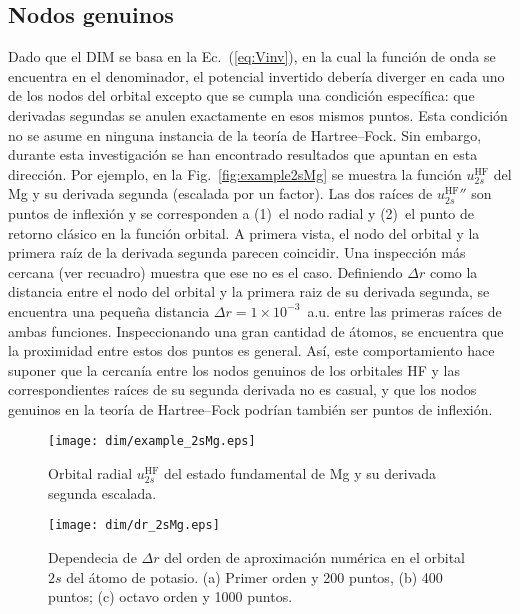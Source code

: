 \subsection{Nodos genuinos}
\label{subsec:nodosHF}

Dado que el DIM se basa en la Ec.~(\ref{eq:Vinv}), en la cual la función de 
onda se encuentra en el denominador, el potencial invertido debería 
diverger en cada uno de los nodos del orbital excepto que se cumpla una 
condición específica: que derivadas segundas se anulen exactamente en 
esos mismos puntos. Esta condición no se asume en ninguna instancia de la 
teoría de Hartree--Fock. Sin embargo, durante esta investigación se han 
encontrado resultados que apuntan en esta dirección. Por ejemplo, en 
la Fig.~\ref{fig:example2sMg} se muestra la función 
$u_{2s}^{\mathrm{HF}}$ del Mg y su derivada segunda (escalada por un 
factor). Las dos raíces de $u_{2s}^{\mathrm{HF}}''$ son puntos de 
inflexión y se corresponden a (1)~el nodo radial y (2)~el punto de 
retorno clásico en la función orbital. A primera vista, el nodo del 
orbital y la primera raíz de la derivada segunda parecen coincidir. Una 
inspección más cercana (ver recuadro) 
muestra que ese no es el caso. Definiendo $\Delta r$ como la distancia 
entre el nodo del orbital y la primera raiz de su derivada segunda, se 
encuentra una pequeña distancia $\Delta r=1\times 10^{-3}$~a.u. entre 
las primeras raíces de ambas funciones. Inspeccionando una gran cantidad 
de átomos, se encuentra que la proximidad entre estos dos puntos es 
general. Así, este comportamiento hace suponer que la cercanía entre los 
nodos genuinos de los orbitales HF y las correspondientes raíces de su 
segunda derivada no es casual, y que los nodos genuinos en la teoría de 
Hartree--Fock podrían también ser puntos de inflexión. 

\begin{figure}
\centering
\vspace{-0.45cm}
\texttt{[image: dim/example\_2sMg.eps]} 
\vspace{-0.45cm}
\caption[Orbital radial y su derivada segunda.]
{Orbital radial $u_{2s}^{\mathrm{HF}}$ del estado fundamental de Mg y su 
derivada segunda escalada.}
\label{fig:example2sMg}

\vspace{0.25cm}
\texttt{[image: dim/dr\_2sMg.eps]} 
\vspace{-0.45cm}
\caption[Dependecia de $\Delta r$ del orden de aproximación numérica.]
{Dependecia de $\Delta r$ del orden de aproximación numérica en el 
orbital $2s$ del átomo de potasio. (a) Primer orden y 200 puntos, (b) 
400 puntos; (c) octavo orden y 1000 puntos.}
\label{fig:dr2sMg}
\end{figure}

